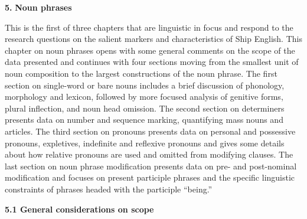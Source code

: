 \clearpage\begin{styleStandard}
\textbf{5.} \textbf{Noun phrases}
\end{styleStandard}

\begin{styleStandard}
This is the first of three chapters that are linguistic in focus and respond to the research questions on the salient markers and characteristics of Ship English. This chapter on noun phrases opens with some general comments on the scope of the data presented and continues with four sections moving from the smallest unit of noun composition to the largest constructions of the noun phrase. The first section on single-word or bare nouns includes a brief discussion of phonology, morphology and lexicon, followed by more focused analysis of genitive forms, plural inflection, and noun head omission. The second section on determiners presents data on number and sequence marking, quantifying mass nouns and articles. The third section on pronouns presents data on personal and possessive pronouns, expletives, indefinite and reflexive pronouns and gives some details about how relative pronouns are used and omitted from modifying clauses. The last section on noun phrase modification presents data on pre- and post-nominal modification and focuses on present participle phrases and the specific linguistic constraints of phrases headed with the participle “being.” 
\end{styleStandard}

\begin{styleStandard}
\textbf{5.1 General considerations on scope}
\end{styleStandard}


